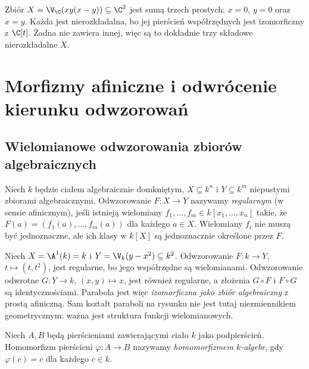 \begin{przyklad}
Zbiór $X=\V_{\C}(xy(x-y))\subseteq\C^2$
jest sumą trzech prostych: $x=0$, $y=0$ oraz $x=y$.
Każda jest nierozkładalna, bo jej pierścień współrzędnych
jest izomorficzny z $\C[t]$. Żadna nie zawiera innej,
więc są to dokładnie trzy składowe nierozkładalne $X$.
\end{przyklad}

\section{Morfizmy afiniczne i odwrócenie kierunku odwzorowań}

\subsection{Wielomianowe odwzorowania zbiorów algebraicznych}

\begin{definicja}
Niech $k$ będzie ciałem algebraicznie domkniętym,
$X\subseteq k^n$ i $Y\subseteq k^m$ niepustymi zbiorami algebraicznymi.
Odwzorowanie $F:X\to Y$ nazywamy \emph{regularnym} (w sensie
afinicznym), jeśli istnieją wielomiany
$f_1,\dots,f_m\in k[x_1,\dots,x_n]$ takie, że
$F(a)=(f_1(a),\dots,f_m(a))$ dla każdego $a\in X$.
Wielomiany $f_i$ nie muszą być jednoznaczne, ale ich klasy w $k[X]$
są jednoznacznie określone przez $F$.
\end{definicja}

\begin{przyklad}
Niech $X=\A^1(k)=k$ i
$Y=\V_k(y-x^2)\subseteq k^2$.
Odwzorowanie $F:k\to Y$, $t\mapsto(t,t^2)$, jest regularne,
bo jego współrzędne są wielomianami. Odwzorowanie odwrotne
$G:Y\to k$, $(x,y)\mapsto x$, jest również regularne,
a złożenia $G\circ F$ i $F\circ G$ są identycznościami.
Parabola jest więc \emph{izomorficzna jako zbiór algebraiczny}
z prostą afiniczną. Sam kształt paraboli na rysunku nie jest
tutaj niezmiennikiem geometrycznym: ważna jest struktura funkcji
wielomianowych.
\end{przyklad}

\begin{definicja}
Niech $A,B$ będą pierścieniami zawierającymi ciało $k$ jako podpierścień.
Homomorfizm pierścieni $\varphi:A\to B$ nazywamy
\emph{homomorfizmem $k$-algebr}, gdy $\varphi(c)=c$
dla każdego $c\in k$.
\end{definicja}

